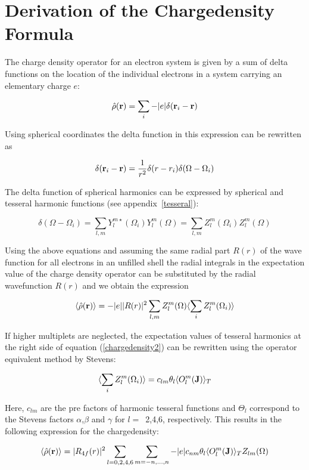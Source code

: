 \newpage
\section{Derivation of the Chargedensity Formula}\label{chargedensityoperator}
 
 The charge density operator for an electron system is given by a sum of delta
 functions on the location of the individual electrons in a system carrying
an elementary charge $e$:
 
 \begin{equation}
 \hat\rho(\mathbf r) = \sum_i -|e| \delta(\mathbf r_i - \mathbf r)
 \end{equation} 
 
 Using spherical coordinates the delta function in this expression can be rewritten as
 
 \begin{equation}
 \delta(\mathbf r_i - \mathbf r) = \frac{1}{r^2}\delta(r-r_i) \delta(\Omega- \Omega_i)
 \end{equation} 
 
 The delta function of spherical harmonics can be expressed by spherical and tesseral harmonic
 functions (see appendix~\ref{tesseral}):
 
 \begin{equation}
  \delta(\Omega- \Omega_i)= \sum_{l,m} Y_l^{m\star}(\Omega_i) Y_l^{m}(\Omega)= \sum_{l,m} Z_l^{m}(\Omega_i) Z_l^{m}(\Omega)
 \end{equation} 
 
 Using the above equations and assuming the same radial part $R(r)$ of the wave function for all electrons in an unfilled %
shell the radial integrals in the expectation value of the charge density operator can be substituted by the radial %
wavefunction $R(r)$ and we obtain the expression
 
  \begin{equation}\label{chargedensity2}
	       \langle \hat\rho(\mathbf r)\rangle=
	       -|e|  |R(r)|^2 \sum_{l,m}Z_l^{m}(\Omega) \langle\sum_i Z_l^{m}(\Omega_i)\rangle
   \end{equation} 

If higher multiplets are neglected, 
the expectation values of tesseral harmonics at the right side of equation (\ref{chargedensity2}) can
be rewritten using the operator equivalent method by Stevens\cite{hutchings64-227}:

  \begin{equation}
	      \langle\sum_i Z_l^{m}(\Omega_i)\rangle = c_{lm} \theta_{l} \langle O_l^m(\mathbf J)\rangle_T 
	      \end{equation} 

Here, $c_{lm}$ are the pre factors of harmonic tesseral
functions and $\Theta_l$
correspond to the Stevens factors $\alpha$,$\beta$ and $\gamma$ for $l=$~2,4,6, respectively.
This results in the following expression for the chargedensity:
		  
  \begin{equation}\label{chargedensity_operator2}
	       \langle \hat\rho(\mathbf r)\rangle=|R_{4f}(r)|^2 \sum_{l=0,2,4,6}\sum_{m=-n,...,n}
	       -|e|  c_{nm} \theta_{l} \langle O_l^m(\mathbf J)\rangle_T Z_{lm}(\Omega)
	      \end{equation} 

  
